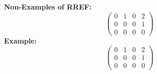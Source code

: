 \documentclass[12pt]{article}
\begin{document}
{\color{Brown}
\textbf{Non-Examples of RREF: }
\[
	\begin{pmatrix}
		0 & 1 & 0 & 2	\\
		0 & 0 & 0 & 1	\\
		0 & 0 & 0 & 0
	\end{pmatrix}
\]
\textbf{Example: }
\[
	\begin{pmatrix}
		0 & 1 & 0 & 2	\\
		0 & 0 & 0 & 1	\\
		0 & 0 & 0 & 0
	\end{pmatrix}
\]


}






\newpage
\end{document}
